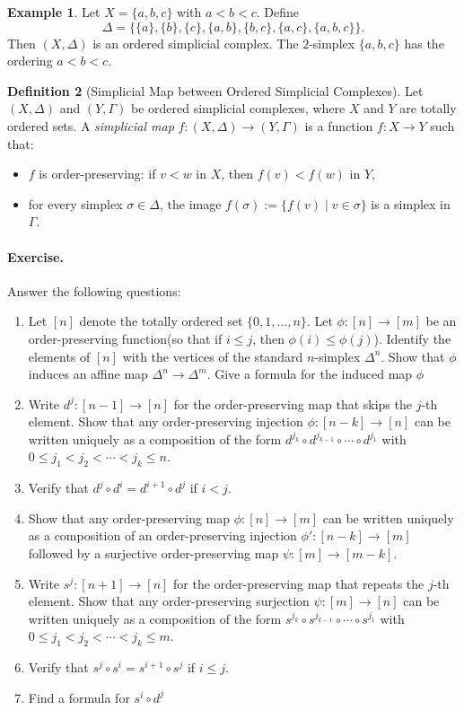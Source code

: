 \documentclass[11pt]{article}
\theoremstyle{definition}
\newtheorem{definition}{Definition}[section]
\newtheorem{example}[definition]{Example}
\theoremstyle{plain}
\begin{document}
\begin{example}
    Let $X = \{a, b, c\}$ with $a < b < c$. Define
    \[
        \Delta = \{ \{a\}, \{b\}, \{c\}, \{a,b\}, \{b,c\}, \{a,c\}, \{a,b,c\} \}.
    \]
    Then $(X, \Delta)$ is an ordered simplicial complex. The $2$-simplex $\{a,b,c\}$ has the ordering $a < b < c$.
\end{example}


\begin{definition}[Simplicial Map between Ordered Simplicial  Complexes]
    Let $(X, \Delta)$ and $(Y, \Gamma)$ be ordered simplicial complexes, where $X$ and $Y$ are totally ordered sets. A \emph{simplicial map} $f : (X, \Delta) \to (Y, \Gamma)$ is a function $f : X \to Y$ such that:
    \begin{itemize}
        \item $f$ is order-preserving: if $v < w$ in $X$, then $f(v) < f(w)$ in $Y$,
        \item for every simplex $\sigma \in \Delta$, the image $f(\sigma) := \{ f(v) \mid v \in \sigma \}$ is a simplex in $\Gamma$.
    \end{itemize}
\end{definition}

\paragraph{Exercise.} Answer the following questions:
\begin{enumerate}[label=(\alph*)]
    \item Let $[n] $ denote the totally ordered set $\{0, 1, \ldots, n\}$. Let $\phi : [n] \to [m]$ be an order-preserving function(so that if $i \leq j$, then
          $\phi(i) \leq \phi(j)$). Identify the elements of $[n] $ with the vertices of
          the standard $n$-simplex $\Delta^n$. Show that $\phi$ induces an affine map $\Delta^n \to \Delta^m$. Give a formula for the induced map $\phi$
    \item Write $d^j : [n-1] \to [n] $ for the order-preserving map that skips the $j$-th element. Show that any order-preserving injection $\phi : [n-k] \to [n]$ can be written uniquely as a composition of the form $d^{j_k} \circ d^{j_{k-1}} \circ \cdots \circ d^{j_1}$ with $ 0 \leq j_1 < j_2 < \cdots < j_k \leq n$.
    \item Verify that $d^j \circ d^i = d^{i+1} \circ d^j$ if $i < j$.
    \item Show that any order-preserving map $\phi : [n] \to [m]$ can be written uniquely as a composition of an order-preserving injection $\phi' : [n-k] \to [m]$ followed by a surjective order-preserving map $\psi : [m] \to [m-k]$.
    \item Write $s^j : [n+1] \to [n]$ for the order-preserving map that repeats the $j$-th element. Show that any order-preserving surjection $\psi : [m] \to [n]$ can be written uniquely as a composition of the form $s^{j_k} \circ s^{j_{k-1}} \circ \cdots \circ s^{j_1}$ with $ 0 \leq j_1 < j_2 < \cdots < j_k \leq m$.
    \item Verify that $s^j \circ s^i = s^{i+1} \circ s^j$ if $i \leq j$.
    \item Find a formula for $s^i \circ d^j $
\end{enumerate}
\end{document}
